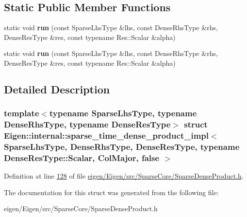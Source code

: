 \subsection*{Static Public Member Functions}
\begin{DoxyCompactItemize}
\item 
\mbox{\label{struct_eigen_1_1internal_1_1sparse__time__dense__product__impl_3_01_sparse_lhs_type_00_01_dense_67299fc86a44049a87b7e209695d23ff_a0c2606fafd49c91c7bf7f96ffcb139d2}} 
static void {\bfseries run} (const Sparse\+Lhs\+Type \&lhs, const Dense\+Rhs\+Type \&rhs, Dense\+Res\+Type \&res, const typename Res\+::\+Scalar \&alpha)
\item 
\mbox{\label{struct_eigen_1_1internal_1_1sparse__time__dense__product__impl_3_01_sparse_lhs_type_00_01_dense_67299fc86a44049a87b7e209695d23ff_a0c2606fafd49c91c7bf7f96ffcb139d2}} 
static void {\bfseries run} (const Sparse\+Lhs\+Type \&lhs, const Dense\+Rhs\+Type \&rhs, Dense\+Res\+Type \&res, const typename Res\+::\+Scalar \&alpha)
\end{DoxyCompactItemize}


\subsection{Detailed Description}
\subsubsection*{template$<$typename Sparse\+Lhs\+Type, typename Dense\+Rhs\+Type, typename Dense\+Res\+Type$>$\newline
struct Eigen\+::internal\+::sparse\+\_\+time\+\_\+dense\+\_\+product\+\_\+impl$<$ Sparse\+Lhs\+Type, Dense\+Rhs\+Type, Dense\+Res\+Type, typename Dense\+Res\+Type\+::\+Scalar, Col\+Major, false $>$}



Definition at line \hyperlink{eigen_2_eigen_2src_2_sparse_core_2_sparse_dense_product_8h_source_l00128}{128} of file \hyperlink{eigen_2_eigen_2src_2_sparse_core_2_sparse_dense_product_8h_source}{eigen/\+Eigen/src/\+Sparse\+Core/\+Sparse\+Dense\+Product.\+h}.



The documentation for this struct was generated from the following file\+:\begin{DoxyCompactItemize}
\item 
eigen/\+Eigen/src/\+Sparse\+Core/\+Sparse\+Dense\+Product.\+h\end{DoxyCompactItemize}

